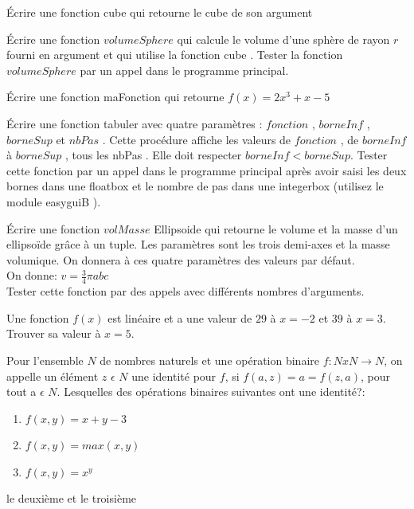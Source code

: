 \begin{exercise}
Écrire une fonction cube qui retourne le cube de son argument
\end{exercise}

\begin{exercise}
Écrire une fonction $volumeSphere$ qui calcule le volume d’une sphère de rayon $r$ fourni
en argument et qui utilise la fonction cube .
Tester la fonction $volumeSphere$ par un appel dans le programme principal.
\end{exercise}

\begin{exercise}
Écrire une fonction maFonction qui retourne $f(x) = 2x^{3} + x - 5$
\end{exercise}

\begin{exercise}
Écrire une fonction tabuler avec quatre paramètres : $fonction$ , $borneInf$ , $borneSup$
et $nbPas$ . Cette procédure affiche les valeurs de $fonction$ , de $borneInf$ à $borneSup$ ,
tous les nbPas . Elle doit respecter $borneInf < borneSup$.
Tester cette fonction par un appel dans le programme principal après avoir saisi les
deux bornes dans une floatbox et le nombre de pas dans une integerbox (utilisez le
module easyguiB ).
\end{exercise}

\begin{exercise}
Écrire une fonction $volMasse$ Ellipsoide qui retourne le volume et la masse d'un ellipsoïde grâce à un tuple. Les paramètres sont les trois demi-axes et la masse volumique. On donnera à ces quatre paramètres des valeurs par défaut. \\
On donne: $v = \frac{3}{4} \pi abc$ \\
Tester cette fonction par des appels avec différents nombres d'arguments.
\end{exercise}

\begin{exercise}
Une fonction $f (x)$ est lin\'eaire et a une valeur de $29$ \`a $x = -2$ et $39$ à $x = 3$. Trouver sa valeur à $x = 5$.
\end{exercise}

\begin{exercise}
Pour l'ensemble $N$ de nombres naturels et une opération binaire $f: N x N \longrightarrow N$, on appelle un élément $z$ $\epsilon$ $N$ une identité pour $f$, si $f (a, z) = a = f (z, a)$, pour tout a $\epsilon$ $N$. Lesquelles des opérations binaires suivantes ont une identité?:
\begin{enumerate}
  \item $f (x, y) = x + y - 3$
  \item $f (x, y) = max(x, y)$
  \item $f (x, y) = x^{y}$
\end{enumerate}
\end{exercise}
\begin{solution}
le deuxième et le troisième 
\end{solution}
